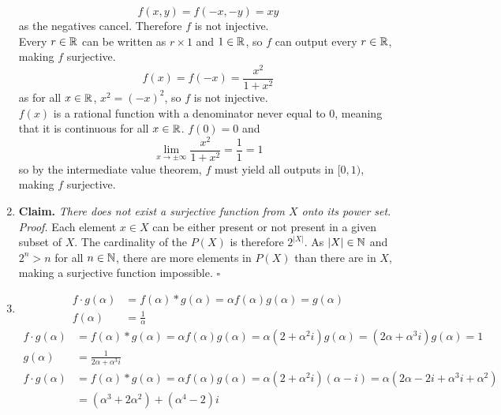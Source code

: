 \documentclass[../MATH145.tex]{subfiles}
\begin{document}
\begin{enumerate}
\begin{tasks}
						\[
							f(x, y) = f(-x, -y)
								= xy
						\]
						as the negatives cancel. Therefore \(f\) is not injective. \\
						Every \(r \in \mathbb{R}\) can be written as \(r \times 1\) and \(1 \in \mathbb{R}\), so \(f\) can output every \(r \in \mathbb{R}\), making \(f\) surjective.
					\task
						\[
							f(x) = f(-x)
								= \frac{x^2}{1 + x^2}
						\]
						as for all \(x \in \mathbb{R}\), \(x^2 = (-x)^2\), so \(f\) is not injective. \\
						\(f(x)\) is a rational function with a denominator never equal to 0, meaning that it is continuous for all \(x \in \mathbb{R}\). \(f(0) = 0\) and 
							\[
								\lim_{x \to \pm\infty} \frac{x^2}{1 + x^2} = \frac{1}{1}
									= 1
							\]
							so by the intermediate value theorem, \(f\) must yield all outputs in \([0, 1)\), making \(f\) surjective.
				\end{tasks}
			\item
				\textbf{Claim.} \textit{There does not exist a surjective function from \(X\) onto its power set.} \\
					\textit{Proof.}
						Each element \(x \in X\) can be either present or not present in a given subset of \(X\). The cardinality of the \(P(X)\) is therefore \(2^{|X|}\). As \(|X| \in \mathbb{N}\) and \(2^n > n\) for all \(n \in \mathbb{N}\), there are more elements in \(P(X)\) than there are in \(X\), making a surjective function impossible. \(\square\)
			\item
				\begin{tasks}
					\task
						\begin{align*}
							f \cdot g(\alpha) &= f(\alpha) * g(\alpha)
									= \alpha f(\alpha)g(\alpha)
									= g(\alpha) \\
							f(\alpha) &= \frac{1}{\alpha}
						\end{align*}
					\task
						\begin{align*}
							f \cdot g(\alpha) &= f(\alpha) * g(\alpha)
									= \alpha f(\alpha)g(\alpha)
									= \alpha(2 + \alpha^2i)g(\alpha)
									= (2\alpha + \alpha^3i)g(\alpha)
									= 1 \\
							g(\alpha) &=  \frac{1}{2\alpha + \alpha^3i}
						\end{align*}
					\task
						\begin{align*}
							f \cdot g(\alpha) &= f(\alpha) * g(\alpha)
									= \alpha f(\alpha)g(\alpha)
									= \alpha(2 + \alpha^2i)(\alpha - i)
									= \alpha(2\alpha - 2i + \alpha^3i + \alpha^2) \\
								&= (\alpha^3 + 2\alpha^2) + (\alpha^4 - 2)i

\end{align*}
\end{tasks}
\end{enumerate}
\end{document}
